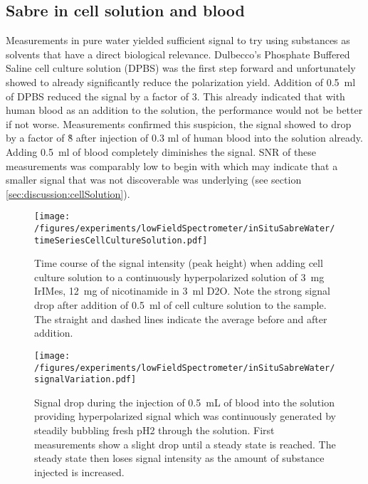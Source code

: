     \subsection{Sabre in cell solution and blood}
    Measurements in pure water yielded sufficient signal to try using substances as solvents that have a direct biological relevance. Dulbecco's Phosphate Buffered Saline cell culture solution (DPBS) was the first step forward and unfortunately showed to already significantly reduce the polarization yield. Addition of \SI{0.5}{\milli\litre} of DPBS reduced the signal by a factor of 3. This already indicated that with human blood as an addition to the solution, the performance would not be better if not worse. Measurements confirmed this suspicion, the signal showed to drop by a factor of \~8 after injection of 0.3 ml of human blood into the solution already. Adding \SI{0.5}{\milli\litre} of blood completely diminishes the signal. SNR of these measurements was comparably low to begin with which may indicate that a smaller signal that was not discoverable was underlying (see section \ref{sec:discussion:cellSolution}).
        \begin{figure}
            \texttt{[image: /figures/experiments/lowFieldSpectrometer/inSituSabreWater/timeSeriesCellCultureSolution.pdf]}
            \caption[Cell culture solution addition to hyperpolarized signal]{Time course of the signal intensity (peak height) when adding cell culture solution to a continuously hyperpolarized solution of \SI{3}{\milli\gram} IrIMes, \SI{12}{\milli\gram} of nicotinamide in \SI{3}{\milli\litre} D2O. Note the strong signal drop after addition of \SI{0.5}{\milli\litre} of cell culture solution to the sample. The straight and dashed lines indicate the average before and after addition.}
            \label{chap:MaterialsAndMethods:bloodInjection}
        \end{figure}
        \begin{figure}
            \centering
            \texttt{[image: /figures/experiments/lowFieldSpectrometer/inSituSabreWater/signalVariation.pdf]}
            \caption[Blood addition to hyperpolarized signal]{Signal drop during the injection of \SI{0.5}{\milli\liter} of blood into the solution providing hyperpolarized signal which was continuously generated by steadily bubbling fresh pH2 through the solution. First measurements show a slight drop until a steady state is reached. The steady state then loses signal intensity as the amount of substance injected is increased.}
            \label{chap:MaterialsAndMethods:bloodInjection2}
        \end{figure}
